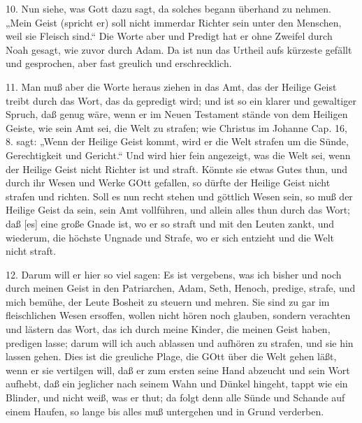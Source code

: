 10. Nun siehe, was Gott dazu sagt, da solches begann überhand zu nehmen. „Mein Geist (spricht er) soll nicht immerdar Richter sein unter
den Menschen, weil sie Fleisch sind.“ Die Worte aber und Predigt hat er ohne Zweifel durch Noah gesagt, wie zuvor durch Adam. Da ist nun das Urtheil aufs kürzeste gefällt und gesprochen, aber fast greulich und erschrecklich.

11. Man muß aber die Worte heraus ziehen in das Amt, das der Heilige Geist treibt durch das Wort, das da gepredigt wird; und ist so ein klarer und gewaltiger Spruch, daß genug wäre, wenn er im Neuen Testament stände von dem Heiligen Geiste, wie sein Amt sei, die Welt zu strafen; wie Christus im Johanne Cap. 16, 8. sagt: „Wenn der Heilige Geist kommt, wird er die Welt strafen um die Sünde, Gerechtigkeit und Gericht.“ Und wird hier fein angezeigt, was die Welt sei, wenn der Heilige Geist nicht Richter ist und straft. Könnte sie etwas Gutes thun, und durch ihr Wesen und Werke GOtt gefallen, so dürfte der Heilige Geist nicht strafen und richten. Soll es nun recht stehen und göttlich Wesen sein, so muß der Heilige Geist da sein, sein Amt vollführen, und allein alles thun durch das Wort; daß [es] eine große Gnade ist, wo er so straft und mit den Leuten zankt, und wiederum, die höchste Ungnade und Strafe, wo er sich entzieht und die Welt nicht straft.

12. Darum will er hier so viel sagen: Es ist vergebens, was ich bisher und noch durch meinen Geist in den Patriarchen, Adam, Seth, Henoch, predige, strafe, und mich bemühe, der Leute Bosheit zu steuern und mehren. Sie sind zu gar im fleischlichen Wesen ersoffen, wollen nicht hören noch glauben, sondern verachten und lästern das Wort, das ich durch meine Kinder, die meinen Geist haben, predigen lasse; darum will ich auch ablassen und aufhören zu strafen, und sie hin lassen gehen. Dies ist die greuliche Plage, die GOtt über die Welt gehen läßt, wenn er sie vertilgen will, daß er zum ersten seine Hand abzeucht und sein Wort aufhebt, daß ein jeglicher nach seinem Wahn und Dünkel hingeht, tappt wie ein Blinder, und nicht weiß, was er thut; da folgt denn alle Sünde und Schande auf einem Haufen, so lange bis alles muß untergehen und in Grund verderben.

